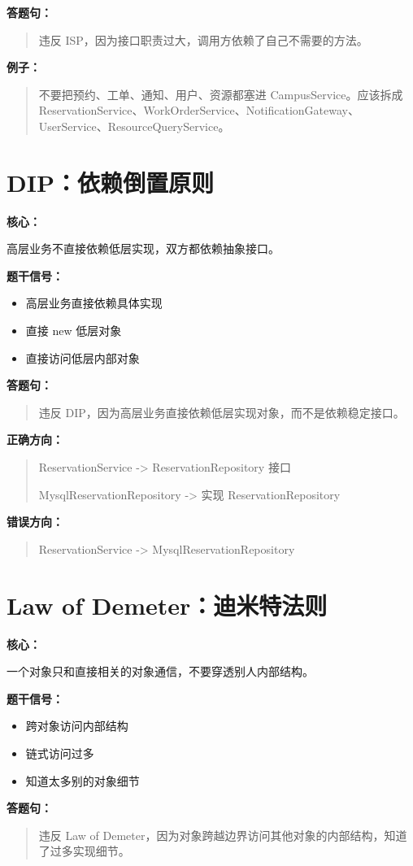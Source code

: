 \documentclass[UTF8,zihao=-4]{ctexart}
\newcommand{\principle}[1]{%
  \section*{\color{TitleBlue}#1}
}
\newcommand{\labeltext}[1]{%
  \textbf{#1}
}
\newenvironment{answerbox}{%
  \begin{quote}\small\color{TextGray}
}{%
  \end{quote}
}
\begin{document}
\labeltext{答题句：}
\begin{answerbox}
违反 ISP，因为接口职责过大，调用方依赖了自己不需要的方法。
\end{answerbox}

\labeltext{例子：}
\begin{answerbox}
不要把预约、工单、通知、用户、资源都塞进 CampusService。应该拆成 ReservationService、WorkOrderService、NotificationGateway、UserService、ResourceQueryService。
\end{answerbox}

\principle{DIP：依赖倒置原则}

\labeltext{核心：}
高层业务不直接依赖低层实现，双方都依赖抽象接口。

\labeltext{题干信号：}
\begin{itemize}
  \item 高层业务直接依赖具体实现
  \item 直接 new 低层对象
  \item 直接访问低层内部对象
\end{itemize}

\labeltext{答题句：}
\begin{answerbox}
违反 DIP，因为高层业务直接依赖低层实现对象，而不是依赖稳定接口。
\end{answerbox}

\labeltext{正确方向：}
\begin{answerbox}
ReservationService -> ReservationRepository 接口

MysqlReservationRepository -> 实现 ReservationRepository
\end{answerbox}

\labeltext{错误方向：}
\begin{answerbox}
ReservationService -> MysqlReservationRepository
\end{answerbox}

\principle{Law of Demeter：迪米特法则}

\labeltext{核心：}
一个对象只和直接相关的对象通信，不要穿透别人内部结构。

\labeltext{题干信号：}
\begin{itemize}
  \item 跨对象访问内部结构
  \item 链式访问过多
  \item 知道太多别的对象细节
\end{itemize}

\labeltext{答题句：}
\begin{answerbox}
违反 Law of Demeter，因为对象跨越边界访问其他对象的内部结构，知道了过多实现细节。
\end{answerbox}
\end{document}
